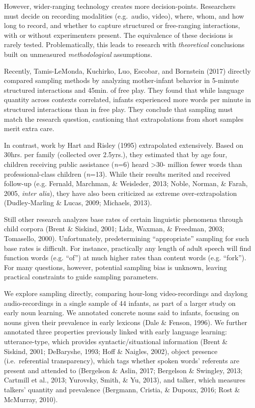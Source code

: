 \documentclass[man]{apa6}
\theoremstyle{definition}
\theoremstyle{definition}
\theoremstyle{definition}
\theoremstyle{remark}
\begin{document}
However, wider-ranging technology creates more decision-points.
Researchers must decide on recording modalities (e.g.~audio, video),
where, whom, and how long to record, and whether to capture structured
or free-ranging interactions, with or without experimenters present. The
equivalence of these decisions is rarely tested. Problematically, this
leads to research with \emph{theoretical} conclusions built on
unmeasured \emph{methodological} assumptions.

Recently, Tamis-LeMonda, Kuchirko, Luo, Escobar, and Bornstein (2017)
directly compared sampling methods by analyzing mother-infant behavior
in 5-minute structured interactions and 45min. of free play. They found
that while language quantity across contexts correlated, infants
experienced more words per minute in structured interactions than in
free play. They conclude that sampling must match the research question,
cautioning that extrapolations from short samples merit extra care.

In contrast, work by Hart and Risley (1995) extrapolated extensively.
Based on 30hrs. per family (collected over 2.5yrs.), they estimated that
by age four, children receiving public assistance (\emph{n}=6) heard
\textgreater{}30- million fewer words than professional-class children
(\emph{n}=13). While their results merited and received follow-up (e.g.
Fernald, Marchman, \& Weisleder, 2013; Noble, Norman, \& Farah, 2005,
\emph{inter alia}), they have also been criticized as extreme
over-extrapolation (Dudley-Marling \& Lucas, 2009; Michaels, 2013).

Still other research analyzes base rates of certain linguistic phenomena
through child corpora (Brent \& Siskind, 2001; Lidz, Waxman, \&
Freedman, 2003; Tomasello, 2000). Unfortunately, predetermining
\enquote{appropriate} sampling for such base rates is difficult. For
instance, practically any length of adult speech will find function
words (e.g. \enquote{of}) at much higher rates than content words (e.g.
\enquote{fork}). For many questions, however, potential sampling bias is
unknown, leaving practical constraints to guide sampling parameters.

We explore sampling directly, comparing hour-long video-recordings and
daylong audio-recordings in a single sample of 44 infants, as part of a
larger study on early noun learning. We annotated concrete nouns said to
infants, focusing on nouns given their prevalence in early lexicons
(Dale \& Fenson, 1996). We further annotated three properties previously
linked with early language learning: utterance-type, which provides
syntactic/situational information (Brent \& Siskind, 2001; DeBaryshe,
1993; Hoff \& Naigles, 2002), object presence (i.e.~referential
transparency), which tags whether spoken words' referents are present
and attended to (Bergelson \& Aslin, 2017; Bergelson \& Swingley, 2013;
Cartmill et al., 2013; Yurovsky, Smith, \& Yu, 2013), and talker, which
measures talkers' quantity and prevalence (Bergmann, Cristia, \& Dupoux,
2016; Rost \& McMurray, 2010).
\end{document}
